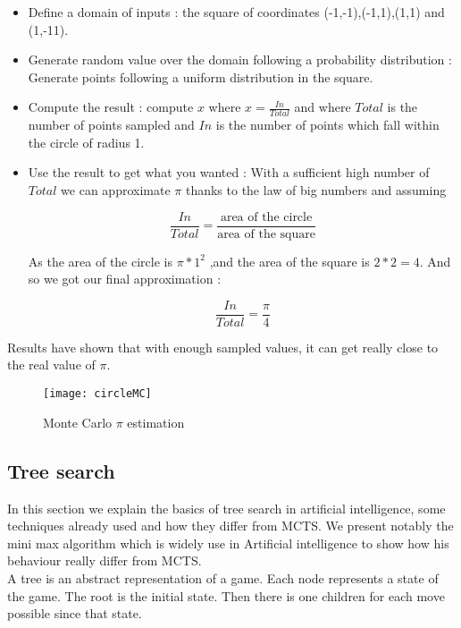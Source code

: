 \begin{itemize}
\item Define a domain of inputs : the square of coordinates (-1,-1),(-1,1),(1,1) and (1,-11).
\item Generate random value over the domain following a probability distribution : Generate points following a uniform distribution in the square. 
\item Compute the result : compute $x$ where $x = \frac{In}{Total}$ and where $Total$ is the number of points sampled and $In$ is the number of points which fall within the circle of radius 1. 
\item Use the result to get what you wanted : With a sufficient high number of $Total$ we can approximate $\pi$ thanks to the law of big numbers and assuming


$$\frac{In}{Total}= \frac{\textrm{area of the circle}}{\textrm{area of the square}}$$

 As the area of the circle is $ \pi*1^2$ ,and the area of the square is $2*2=4$. And so we got our final approximation : 

$$
\frac{In}{Total}=\frac{\pi}{4}
$$
\end{itemize} 

Results have shown that with enough sampled values, it can get really close to the real value of $\pi$. 
\begin{figure}
\begin{center}
\texttt{[image: circleMC]}
\end{center}
\caption{Monte Carlo $\pi$ estimation}
\end{figure}
\subsection{Tree search}
In this section we explain the basics of tree search in artificial intelligence, some techniques already used and how they differ from MCTS. We present notably the mini max algorithm which is widely use in Artificial intelligence to show how his behaviour really differ from MCTS. 
\\

A tree is an abstract representation of a game. Each node represents a state of the game. The root is the initial state. Then there is one children for each move possible since that state. 
\\

